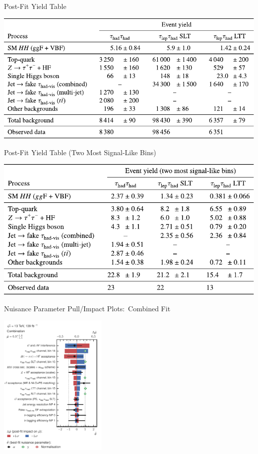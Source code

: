 \documentclass[11pt, xcolor={dvipsnames}, aspectratio=169, notes]{beamer}
\begin{document}

\begin{frame}{Post-Fit Yield Table}
  \centering

  \includegraphics[scale=0.9]{yieldtable_postfit}
\end{frame}


\begin{frame}{Post-Fit Yield Table (Two Most Signal-Like Bins)}
  \centering

  \includegraphics[scale=0.9]{backup/yield_tables_signallike}
\end{frame}


\begin{frame}{Nuisance Parameter Pull/Impact Plots:\ Combined Fit}
  \centering

  \includegraphics[width=0.39\textwidth]{results_nonres/rankings/ranking_nonres_combined}
\end{frame}
\end{document}
